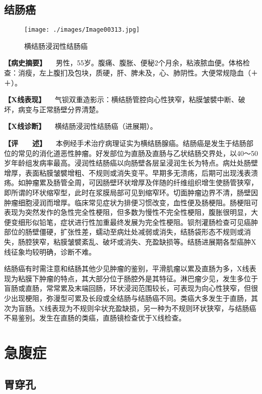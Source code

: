 \subsection{结肠癌}

\begin{figure}[!htbp]
 \centering
 \texttt{[image: ./images/Image00313.jpg]}
 \captionsetup{justification=centering}
 \caption{横结肠浸润性结肠癌}
 \label{fig5-6-7}
  \end{figure} 

\textbf{【病史摘要】}
　男性，55岁。腹痛、腹胀、便秘2个月余，粘液脓血便。体格检查：消瘦，左上腹扪及包块，质硬，肝、脾未及，心、肺阴性。大便常规隐血（＋＋）。

\textbf{【X线表现】}
　气钡双重造影示：横结肠管腔向心性狭窄，粘膜皱襞中断、破坏，病变与正常肠壁分界清楚。

\textbf{【X线诊断】} 　横结肠浸润性结肠癌（进展期）。

\textbf{【评　　述】}
　本例经手术治疗病理证实为横结肠腺癌。结肠癌是发生于结肠部位的常见的消化道恶性肿瘤。好发部位为直肠及直肠与乙状结肠交界处，以40～50岁年龄组发病率最高。浸润性结肠癌以向肠壁各层呈浸润生长为特点。病灶处肠壁增厚，表面粘膜皱襞增粗、不规则或消失变平。早期多无溃疡，后期可出现浅表溃疡。如肿瘤累及肠管全周，可因肠壁环状增厚及伴随的纤维组织增生使肠管狭窄，即所谓的环状缩窄型，此时在浆膜局部可见到缩窄环。切面肿瘤边界不清，肠壁因肿瘤细胞浸润而增厚。临床常见症状为排便习惯改变，血性便及肠梗阻。肠梗阻可表现为突然发作的急性完全性梗阻，但多数为慢性不完全性梗阻，腹胀很明显，大便变细形似铅笔，症状进行性加重最终发展为完全性梗阻。钡剂灌肠检查可见癌肿部位的肠壁僵硬，扩张性差，蠕动至病灶处减弱或消失，结肠袋形态不规则或消失，肠腔狭窄，粘膜皱襞紊乱、破坏或消失、充盈缺损等。结肠进展期各型癌肿X线征象均较明确，诊断不难。

结肠癌有时需注意和结肠其他少见肿瘤的鉴别，平滑肌瘤以累及直肠为多，X线表现为粘膜下肿瘤的特点，其大部分位于肠腔外是其特征。淋巴瘤少见，发生多位于盲肠或直肠，常常累及末端回肠，环状浸润范围较长，可表现为向心性狭窄，但很少出现梗阻，弥漫型可累及长段或全结肠与结肠癌不同。类癌大多发生于直肠，其次为盲肠。X线表现为不规则伞状充盈缺损，另一种为不规则环状狭窄，与结肠癌不易鉴别。发生在直肠的类癌，直肠镜检查优于X线检查。

\section{急腹症}

\subsection{胃穿孔}

